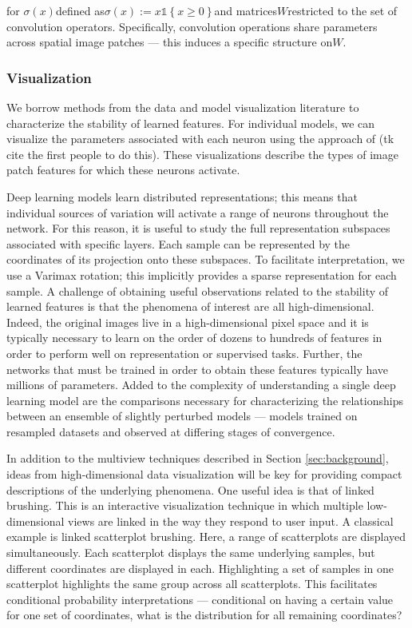 for $\sigma\left(x\right)$defined as$\sigma\left(x\right) := x \mathbb{1}\left\{x \geq 0\right\}$and matrices$W$restricted to the set of convolution operators. Specifically, convolution operations share parameters across spatial image patches — this induces a specific structure on$W$.

\subsubsection{Visualization}

We borrow methods from the data and model visualization literature to characterize the stability of learned features. For individual models, we can visualize the parameters associated with each neuron using the approach of (tk cite the first people to do this). These visualizations describe the types of image patch features for which these neurons activate.

Deep learning models learn distributed representations; this means that individual sources of variation will activate a range of neurons throughout the network. For this reason, it is useful to study the full representation subspaces associated with specific layers. Each sample can be represented by the coordinates of its projection onto these subspaces. To facilitate interpretation, we use a Varimax rotation; this implicitly provides a sparse representation for each sample.
A challenge of obtaining useful observations related to the stability of learned features is that the phenomena of interest are all high-dimensional. Indeed, the original images live in a high-dimensional pixel space and it is typically necessary to learn on the order of dozens to hundreds of features in order to perform well on representation or supervised tasks. Further, the networks that must be trained in order to obtain these features typically have millions of parameters. Added to the complexity of understanding a single deep learning model are the comparisons necessary for characterizing the relationships between an ensemble of slightly perturbed models — models trained on resampled datasets and observed at differing stages of convergence.

In addition to the multiview techniques described in Section \ref{sec:background}, ideas from high-dimensional data visualization will be key for providing compact descriptions of the underlying phenomena. One useful idea is that of linked brushing. This is an interactive visualization technique in which multiple low-dimensional views are linked in the way they respond to user input. A classical example is linked scatterplot brushing. Here, a range of scatterplots are displayed simultaneously. Each scatterplot displays the same underlying samples, but different coordinates are displayed in each. Highlighting a set of samples in one scatterplot highlights the same group across all scatterplots. This facilitates conditional probability interpretations — conditional on having a certain value for one set of coordinates, what is the distribution for all remaining coordinates?

